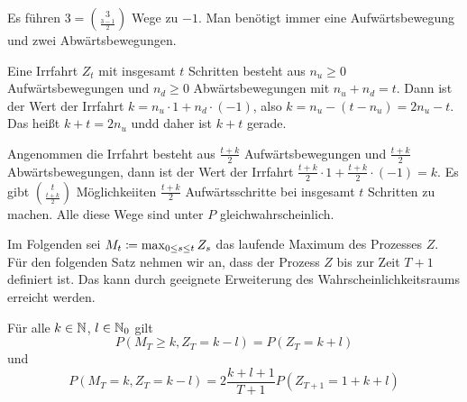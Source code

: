 \documentclass[a4paper,twoside,DIV15,BCOR12mm]{scrbook}
\begin{document}
\begin{bemerkung}
Es führen $3 = \binom{3}{\frac{3-1}{2}}$ Wege zu $-1$. Man benötigt immer eine Aufwärtsbewegung und zwei Abwärtsbewegungen.
\begin{center}
\end{center}
Eine Irrfahrt $Z_t$ mit insgesamt $t$ Schritten besteht aus $n_u\ge 0$ Aufwärtsbewegungen und $n_d\ge 0$ Abwärtsbewegungen mit $n_u + n_d = t$. Dann ist der Wert der Irrfahrt $k = n_u \cdot 1 + n_d \cdot (-1)$, also $k = n_u - (t-n_u) = 2n_u - t$.
Das heißt $k+t = 2n_u$ undd daher ist $k+t$ gerade.

Angenommen die Irrfahrt besteht aus $\frac{t+k}2$ Aufwärtsbewegungen und $\frac{t+k}2$ Abwärtsbewegungen, dann ist der Wert der Irrfahrt $\frac{t+k}2\cdot 1 + \frac{t+k}2\cdot (-1) = k$. Es gibt $\binom{t}{\frac{t+k}2}$ Möglichkeiiten $\frac{t+k}2$ Aufwärtsschritte bei insgesamt $t$ Schritten zu machen. Alle diese Wege sind unter $P$ gleichwahrscheinlich.
\end{bemerkung}

Im Folgenden sei $M_t \da \max_{0\le s\le t} Z_s$ das laufende Maximum des Prozesses $Z$. Für den folgenden Satz nehmen wir an, dass der Prozess $Z$ bis zur Zeit $T+1$ definiert ist. Das kann durch geeignete Erweiterung des Wahrscheinlichkeitsraums erreicht werden.

\begin{satz}[Spiegelungsprinzip]
Für alle $k\in \mathbb{N}$, $l\in \mathbb{N}_0$ gilt 
\[
P(M_T\ge k, Z_T=k-l) = P(Z_T=k+l)
\]
und
\[
P(M_T = k , Z_T = k-l) = 2 \frac{k+l+1}{T+1} P (Z_{T+1} = 1 + k + l)
\]
\end{satz}
\end{document}
